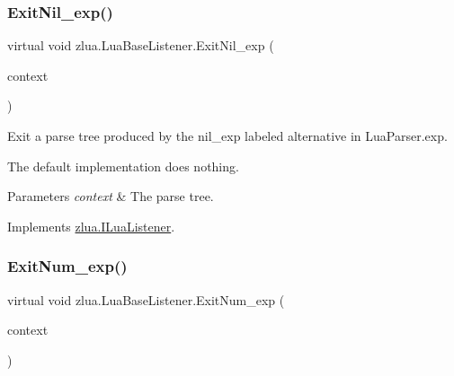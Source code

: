 \subsubsection{\texorpdfstring{Exit\+Nil\+\_\+exp()}{ExitNil\_exp()}}
{\footnotesize\ttfamily virtual void zlua.\+Lua\+Base\+Listener.\+Exit\+Nil\+\_\+exp (\begin{DoxyParamCaption}\item[{\mbox{[}\+Not\+Null\mbox{]} \mbox{\hyperlink{classzlua_1_1_lua_parser_1_1_nil__exp_context}{Lua\+Parser.\+Nil\+\_\+exp\+Context}}}]{context }\end{DoxyParamCaption})\hspace{0.3cm}{\ttfamily [virtual]}}



Exit a parse tree produced by the {\ttfamily nil\+\_\+exp} labeled alternative in Lua\+Parser.\+exp. 

The default implementation does nothing.


\begin{DoxyParams}{Parameters}
{\em context} & The parse tree.\\
\hline
\end{DoxyParams}


Implements \mbox{\hyperlink{interfacezlua_1_1_i_lua_listener_a7b5aa1a0b4e1441c884028a324f69439}{zlua.\+I\+Lua\+Listener}}.

\mbox{\label{classzlua_1_1_lua_base_listener_a450c13a6c541dd5eed0c0713fdf81343}} 
\subsubsection{\texorpdfstring{Exit\+Num\+\_\+exp()}{ExitNum\_exp()}}
{\footnotesize\ttfamily virtual void zlua.\+Lua\+Base\+Listener.\+Exit\+Num\+\_\+exp (\begin{DoxyParamCaption}\item[{\mbox{[}\+Not\+Null\mbox{]} \mbox{\hyperlink{classzlua_1_1_lua_parser_1_1_num__exp_context}{Lua\+Parser.\+Num\+\_\+exp\+Context}}}]{context }\end{DoxyParamCaption})\hspace{0.3cm}{\ttfamily [virtual]}}



